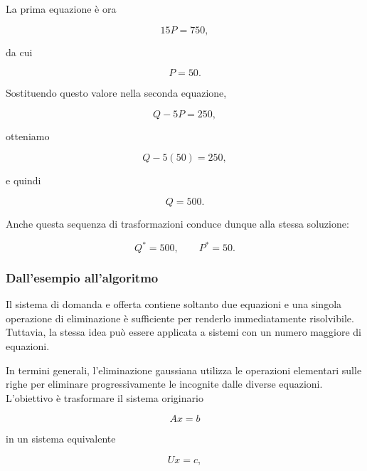 La prima equazione è ora

\begin{equation*}
    15P=750,
\end{equation*}

da cui

\begin{equation*}
    P=50.
\end{equation*}

Sostituendo questo valore nella seconda equazione,

\begin{equation*}
    Q-5P=250,
\end{equation*}

otteniamo

\begin{equation*}
    Q-5(50)=250,
\end{equation*}

e quindi

\begin{equation*}
    Q=500.
\end{equation*}

Anche questa sequenza di trasformazioni conduce dunque alla stessa
soluzione:

\begin{equation*}
    Q^*=500,
    \qquad
    P^*=50.
\end{equation*}


\subsubsection{Dall'esempio all'algoritmo}

Il sistema di domanda e offerta contiene soltanto due equazioni e
una singola operazione di eliminazione è sufficiente per renderlo
immediatamente risolvibile. Tuttavia, la stessa idea può essere
applicata a sistemi con un numero maggiore di equazioni.

In termini generali, l'eliminazione gaussiana utilizza le operazioni
elementari sulle righe per eliminare progressivamente le incognite
dalle diverse equazioni. L'obiettivo è trasformare il sistema
originario

\begin{equation*}
    Ax=b
\end{equation*}

in un sistema equivalente

\begin{equation*}
    Ux=c,
\end{equation*}

